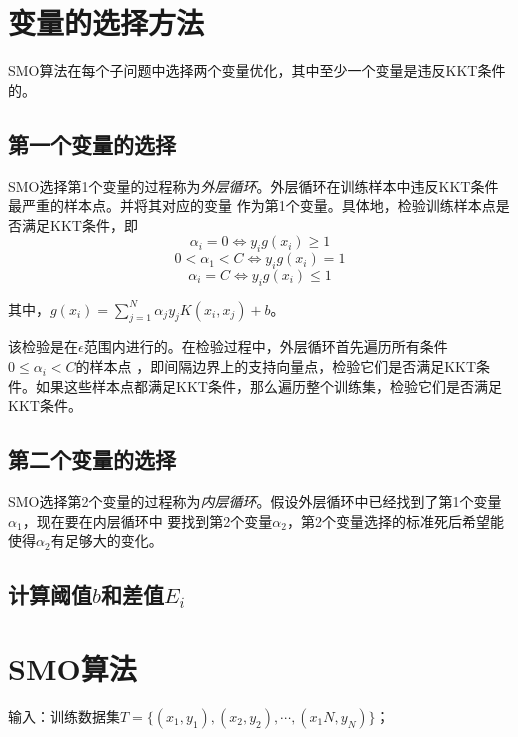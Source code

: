\section{变量的选择方法}

SMO算法在每个子问题中选择两个变量优化，其中至少一个变量是违反KKT条件的。

\subsection*{第一个变量的选择}

SMO选择第1个变量的过程称为\textsl{外层循环}。外层循环在训练样本中违反KKT条件最严重的样本点。并将其对应的变量
作为第1个变量。具体地，检验训练样本点是否满足KKT条件，即
\begin{equation}
    \alpha_i=0\Leftrightarrow y_ig(x_i)\geqslant 1
\end{equation}
\begin{equation}
    0<\alpha_1<C\Leftrightarrow y_ig(x_i)=1
\end{equation}
\begin{equation}
    \alpha_i=C\Leftrightarrow y_ig(x_i)\leqslant 1
\end{equation}

其中，$g(x_i)=\sum\limits_{j=1}^{N}\alpha_jy_jK(x_i,x_j)+b$。

该检验是在$\epsilon$范围内进行的。在检验过程中，外层循环首先遍历所有条件$0\leqslant \alpha_i<C$的样本点
，即间隔边界上的支持向量点，检验它们是否满足KKT条件。如果这些样本点都满足KKT条件，那么遍历整个训练集，检验它们是否满足KKT条件。

\subsection*{第二个变量的选择}

SMO选择第2个变量的过程称为\textsl{内层循环}。假设外层循环中已经找到了第1个变量$\alpha_1$，现在要在内层循环中
要找到第2个变量$\alpha_2$，第2个变量选择的标准死后希望能使得$\alpha_2$有足够大的变化。

\subsection*{计算阈值$b$和差值$E_i$}

\section{SMO算法}

输入：训练数据集$T=\{(x_1,y_1),(x_2,y_2),\cdots,(x_1N,y_N)\}$；

